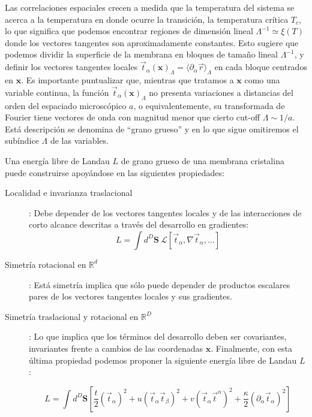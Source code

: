 Las correlaciones espaciales crecen a medida que la temperatura del sistema se
acerca a la temperatura en donde ocurre la transición, la temperatura
crítica $T_c$, lo que significa que podemos encontrar regiones de dimensión
lineal $\Lambda^{-1}\simeq \xi(T) $ donde los vectores tangentes son
aproximadamente constantes. Esto sugiere que podemos dividir la superficie de
la membrana en bloques de tamaño lineal $\Lambda^{-1}$, y definir los vectores
tangentes locales
$\vec{t}_{\alpha}(\mathbf{x})_{\Lambda}=\langle \partial_{\alpha}\vec{r}\rangle_{\Lambda}$
en cada bloque centrados en $\mathbf{x}$. Es importante puntualizar que,
mientras que tratamos a $\mathbf{x}$ como una variable continua, la función
$\vec{t}_{\alpha}(\mathbf{x})_{\Lambda}$ no presenta variaciones a distancias
del orden del espaciado microscópico $a$, o equivalentemente, su transformada
de Fourier tiene vectores de onda con magnitud menor que cierto cut-off
$\Lambda \sim 1/a$. Está descripción se denomina de ``grano grueso'' y en lo
que sigue omitiremos el subíndice $\Lambda$ de las variables.

Una energía libre de Landau $L$ de grano grueso de una membrana cristalina
puede construirse apoyándose en las siguientes propiedades:
\begin{description}
\item[Localidad e invarianza traslacional]: Debe depender de los vectores
  tangentes locales y de las interacciones de corto alcance descritas a través
  del desarrollo en gradientes:
  $$ L=\int\! d^D\mathbf{S}\ \mathcal{L}[\vec{t}_{\alpha},\nabla
  \vec{t}_{\alpha},\dots]$$ 
\item[Simetría rotacional en $\mathbb{R}^d$]: Está simetría implica que sólo
  puede depender de productos escalares pares de los vectores tangentes
  locales y sus gradientes. 

\item[Simetría traslacional y rotacional en $\mathbb{R}^D$]: Lo que implica
  que los términos del desarrollo deben ser covariantes, invariantes frente a
  cambios de las coordenadas $\mathbf{x}$. Finalmente, con esta última
  propiedad podemos proponer la siguiente energía libre de Landau $L$:

  \begin{equation}
    L=\int d^D\mathbf{S}
    \left[
      \frac{t}{2}(\vec{t}_{\alpha})^2+
      u(\vec{t}_{\alpha}\vec{t}_{\beta})^2+
      v(\vec{t}_{\alpha}\vec{t}^{\alpha})^2+
      \frac{\kappa}{2}(\partial_{\alpha}\vec{t}_{\alpha})^2
    \right]
  \end{equation}
\end{description}

